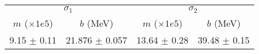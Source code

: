 \begin{tabular}{cc|cc}
\multicolumn{2}{c|}{$\sigma_1$} & \multicolumn{2}{|c}{$\sigma_2$} \\
$m$ ($\times1e5$) & $b$ (MeV) & $m$ ($\times1e5$) & $b$ (MeV) \\
\hline
9.15 $\pm$ 0.11 & 21.876 $\pm$ 0.057 & 13.64 $\pm$ 0.28 & 39.48 $\pm$ 0.15\\
\end{tabular}
